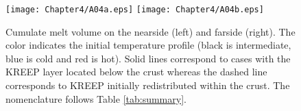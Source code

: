 \begin{figure}\begin{center}
\texttt{[image: Chapter4/A04a.eps]}
\texttt{[image: Chapter4/A04b.eps]}
\caption{Cumulate melt volume on the nearside (left) and farside (right). The color indicates the
initial temperature profile (black is intermediate, blue is cold and red is hot). Solid lines
correspond to cases with the KREEP layer located below the crust whereas the dashed line corresponds
to KREEP initially redistributed within the crust. The nomenclature follows Table \ref{tab:summary}.} 
\label{fig:A4} \end{center} \end{figure} 


